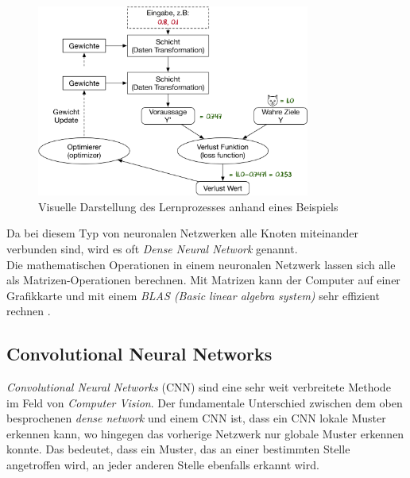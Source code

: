 \begin{figure}[hbt]
	\centering
		\includegraphics[width=0.8\textwidth]{assets/anatomy.png}
	\caption{Visuelle Darstellung des Lernprozesses anhand eines Beispiels}
	\label{img:anatomy}
\end{figure}

Da bei diesem Typ von neuronalen Netzwerken alle Knoten miteinander verbunden sind, wird es oft \textit{Dense Neural Network} genannt.
\\
Die mathematischen Operationen in einem neuronalen Netzwerk lassen sich alle als Matrizen-Operationen berechnen. Mit Matrizen kann der Computer auf einer Grafikkarte und mit einem \textit{BLAS (Basic linear algebra system)} sehr effizient rechnen \parencite{neuronale_netze} .


\subsection{Convolutional Neural Networks}
\textit{Convolutional Neural Networks} (CNN) sind eine sehr weit verbreitete Methode im Feld von \textit{Computer Vision}. Der fundamentale Unterschied zwischen dem oben besprochenen \textit{dense network} und einem CNN ist, dass ein CNN lokale Muster erkennen kann, wo hingegen das vorherige Netzwerk nur globale Muster erkennen konnte. Das bedeutet, dass ein Muster, das an einer bestimmten Stelle angetroffen wird, an jeder anderen Stelle ebenfalls erkannt wird. \parencite{chollet}

